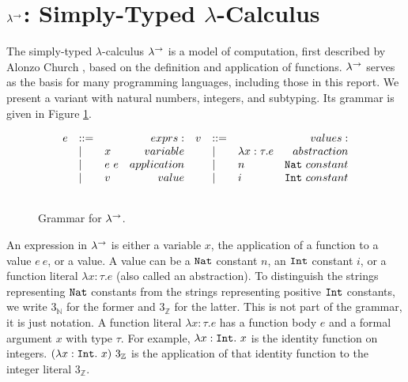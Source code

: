 \section{ $\lambda^{\rightarrow}$: Simply-Typed $\lambda$-Calculus}

The simply-typed $\lambda$-calculus $\lambda^{\rightarrow}$ is a model of computation, first described by Alonzo Church \cite{church40}, based on the definition and application of functions. $\lambda^{\rightarrow}$ serves as the basis for many programming languages, including those in this report. We present a variant with natural numbers, integers, and subtyping. Its grammar is given in Figure \ref{fig:stlc_grammar}.

\begin{figure}[h]
\vspace{-5pt}

\[
\begin{array}{lll}

\begin{array}{lllr}

e & ::= & ~ & exprs: \\
	& | & x & variable \\
	& | & e~e & application \\
	& | & v & value \\
	&&\\
	
\end{array}

\begin{array}{lllr}

v & ::= & ~ & values: \\
	& | & \lambda x: \tau . e & abstraction \\
	& | & n & \mathtt{Nat}~constant \\
	& | & i & \mathtt{Int}~constant \\
	&&\\
	
\end{array}

\end{array}
\]

\vspace{-12pt}
\caption{Grammar for $\lambda^{\rightarrow}$.}
\label{fig:stlc_grammar}
\end{figure}

An expression in $\lambda^{\rightarrow}$ is either a variable $x$, the application of a function to a value $e~e$, or a value. A value can be a $\mathtt{Nat}$ constant $n$, an $\mathtt{Int}$ constant $i$, or a function literal $\lambda x: \tau.e$ (also called an abstraction). To distinguish the strings representing $\mathtt{Nat}$ constants from the strings representing positive $\mathtt{Int}$ constants, we write $3_{\mathbb{N}}$ for the former and $3_{\mathbb{Z}}$ for the latter. This is not part of the grammar, it is just notation. A function literal $\lambda x: \tau.e$ has a function body $e$ and a formal argument $x$ with type $\tau$. For example, $\lambda x: \mathtt{Int}. ~x$ is the identity function on integers. $(\lambda x: \mathtt{Int}.~ x)~3_{\mathbb{Z}}$ is the application of that identity function to the integer literal $3_{\mathbb{Z}}$. 

